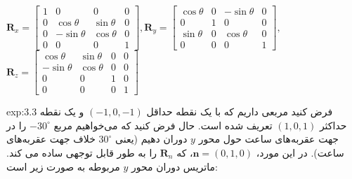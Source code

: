 {\begin{spacing}{1.5}
        \begin{center}
            $\textbf{R}_{x}=\begin{bmatrix}
                                1 & 0           & 0          & 0 \\
                                0 & \cos\theta  & \sin\theta & 0 \\
                                0 & -\sin\theta & \cos\theta & 0 \\
                                0 & 0           & 0          & 1
            \end{bmatrix}, \textbf{R}_{y}=\begin{bmatrix}
                                              \cos\theta & 0 & -\sin\theta & 0 \\
                                              0          & 1 & 0           & 0 \\
                                              \sin\theta & 0 & \cos\theta  & 0 \\
                                              0          & 0 & 0           & 1
            \end{bmatrix},$\\$\textbf{R}_{z}=\begin{bmatrix}
                                                 \cos\theta  & \sin\theta & 0 & 0 \\
                                                 -\sin\theta & \cos\theta & 0 & 0 \\
                                                 0           & 0          & 1 & 0 \\
                                                 0           & 0          & 0 & 1
            \end{bmatrix}$
        \end{center}

        \begin{example}{exp:3.3}
            \Large
            فرض کنید مربعی داریم که با یک نقطه حداقل $(-1, 0, -1)$ و یک نقطه حداکثر $(1, 0, 1)$ تعریف شده است.
            حال فرض کنید که می‌خواهیم مربع $-30^\circ$ را در جهت عقربه‌های ساعت حول محور $y$ دوران دهیم (یعنی $30^\circ$ خلاف جهت عقربه‌های ساعت).
            در این مورد، $\textbf{n}=(0,1,0)$، که $\textbf{R}_{n}$ را به طور قابل توجهی ساده می کند.
            ماتریس دوران محور $y$  مربوطه به صورت زیر است:


\end{example}
\end{spacing}}
